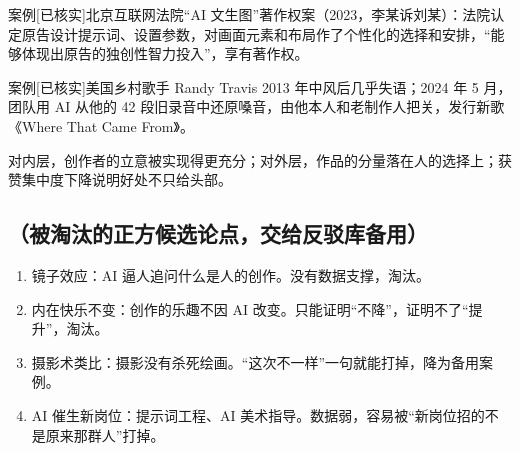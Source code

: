 \documentclass[prep,both]{debate}
\begin{document}
\begin{fields}
\begin{evidence}{案例}[已核实]北京互联网法院“AI 文生图”著作权案（2023，李某诉刘某）：法院认定原告设计提示词、设置参数，对画面元素和布局作了个性化的选择和安排，“能够体现出原告的独创性智力投入”，享有著作权。\end{evidence}
\begin{evidence}{案例}[已核实]美国乡村歌手 Randy Travis 2013 年中风后几乎失语；2024 年 5 月，团队用 AI 从他的 42 段旧录音中还原嗓音，由他本人和老制作人把关，发行新歌《Where That Came From》。\end{evidence}
\closing{对内层，创作者的立意被实现得更充分；对外层，作品的分量落在人的选择上；获赞集中度下降说明好处不只给头部。}
\begin{clash}\end{clash}
\end{fields}

\subsection{（被淘汰的正方候选论点，交给反驳库备用）}
\begin{enumerate}[leftmargin=1.8em]
\item 镜子效应：AI 逼人追问什么是人的创作。没有数据支撑，淘汰。
\item 内在快乐不变：创作的乐趣不因 AI 改变。只能证明“不降”，证明不了“提升”，淘汰。
\item 摄影术类比：摄影没有杀死绘画。“这次不一样”一句就能打掉，降为备用案例。
\item AI 催生新岗位：提示词工程、AI 美术指导。数据弱，容易被“新岗位招的不是原来那群人”打掉。
\end{enumerate}
\end{document}
